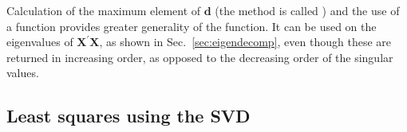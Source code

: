 \documentclass[shortnames,article]{jss}
\begin{document}

Calculation of the maximum element of $\bm d$ (the method is called
) and the use of a  function
provides greater generality of the function.  It can be used on the
eigenvalues of $\bm X^\prime\bm X$, as shown in
Sec.~\ref{sec:eigendecomp}, even though these are returned in
increasing order, as opposed to the decreasing order of the singular
values.

\subsection{Least squares using the SVD}
\label{sec:SVDls}
\end{document}
